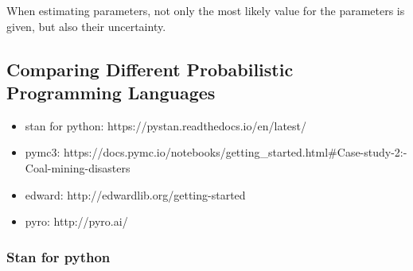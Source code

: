 \documentclass{article}
\begin{document}
When estimating parameters, not only the most likely value for the parameters is given, but also their uncertainty.

\subsection{Comparing Different Probabilistic Programming Languages}

\begin{itemize}
	\item stan for python: https://pystan.readthedocs.io/en/latest/
	\item pymc3: https://docs.pymc.io/notebooks/getting\_started.html\#Case-study-2:-Coal-mining-disasters
	\item edward: http://edwardlib.org/getting-started
	\item pyro: http://pyro.ai/
\end{itemize}

\subsubsection{Stan for python}
\end{document}
